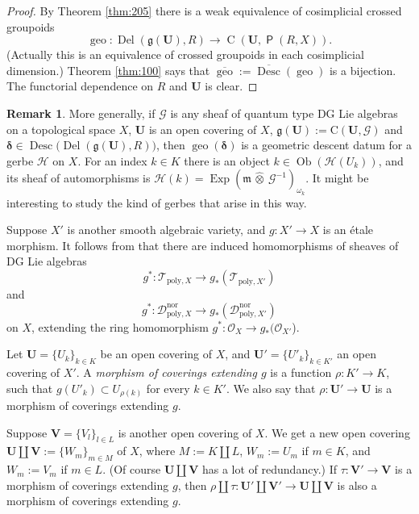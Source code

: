 \documentclass[a4paper, 10pt]{amsart}
\theoremstyle{definition}
\newtheorem{rem}[equation]{Remark}
\numberwithin{equation}{section}
\newcommand{\opn}{\operatorname}
\newcommand{\cat}[1]{\operatorname{\mathsf{#1}}}
\newcommand{\ol}{\overline}
\newcommand{\mfrak}[1]{\mathfrak{#1}}
\newcommand{\mcal}[1]{\mathcal{#1}}
\newcommand{\mrm}[1]{\mathrm{#1}}
\newcommand{\bsym}[1]{\boldsymbol{#1}}
\newcommand{\hatotimes}[1]{\, \what{{\otimes}}_{#1} \,}
\newcommand{\hot}{\hatotimes{}}
\newcommand{\what}[1]{\widehat{#1}}
\newcommand{\g}{\mfrak{g}}
\newcommand{\m}{\mfrak{m}}
\newcommand{\om}{\omega}
\newcommand{\gerbe}[1]{\bsym{\mcal{#1}}}
\newcommand{\twocat}[1]{\operatorname{\bsym{\cat{#1}}}}
\begin{document}
\begin{proof}
By Theorem \ref{thm:205} there is a weak equivalence of cosimplicial crossed 
groupoids  
\[  \opn{geo} :  \opn{Del}(\g(\bsym{U}) , R) \to
\opn{C}(\bsym{U} , \twocat{P}(R, X))  . \]
(Actually this is an equivalence of crossed groupoids in each cosimplicial
dimension.) Theorem \ref{thm:100} says that 
$\ol{\opn{geo}} := \ol{\opn{Desc}}(\opn{geo})$ is a bijection.
The functorial dependence on $R$ and $\bsym{U}$ is clear.
\end{proof}

\begin{rem}
More generally, if $\mcal{G}$ is any sheaf of quantum type DG Lie
algebras on a topological space $X$, 
$\bsym{U}$ is an open covering of $X$,
$\g(\bsym{U}) := \mrm{C}(\bsym{U}, \mcal{G})$
and 
$\bsym{\delta} \in \opn{Desc}\bigl( \opn{Del}(\g(\bsym{U}), R) \bigr)$, 
then $\opn{geo}(\bsym{\delta})$ is a geometric descent datum for a gerbe 
$\gerbe{H}$ on $X$. For an index $k \in K$ 
there is an object
$k \in \opn{Ob} (\gerbe{H}(U_k))$, and its sheaf of automorphisms
is 
$\gerbe{H}(k) = \opn{Exp}(\m \hot \mcal{G}^{-1})_{\om_{k}}$.
It might be interesting to study the kind of gerbes that arise in
this way.
\end{rem}

Suppose $X'$ is another smooth algebraic variety, and $g : X' \to X$ is an
\'etale morphism. 
It follows from \cite[Proposition 4.6]{Ye2} that there are
induced homomorphisms of sheaves of DG Lie algebras 
\begin{equation}
g^* : \mcal{T}^{}_{\mrm{poly}, X} \to
g_* (\mcal{T}^{}_{\mrm{poly}, X'})
\end{equation}
and
\begin{equation}
g^* : \mcal{D}_{\mrm{poly}, X}^{\mrm{nor}} \to 
g_* (\mcal{D}_{\mrm{poly}, X'}^{\mrm{nor}})
\end{equation}
on $X$, extending the ring homomorphism
$g^* : \mcal{O}_X \to g_* (\mcal{O}_{X'}$).

Let $\bsym{U} = \{ U_k \}_{k \in K}$ be an open covering of $X$,
and $\bsym{U}' = \{ U'_k \}_{k \in K'}$ an open covering of
$X'$. A {\em morphism of coverings extending $g$}
is a function $\rho : K' \to K$, such that $g(U'_k) \subset U_{\rho(k)}$ for
every $k \in K'$. We also say that
$\rho : \bsym{U}' \to \bsym{U}$
is a morphism of coverings extending $g$.

Suppose $\bsym{V} = \{ V_l \}_{l \in L}$ is another open
covering of $X$. We get a new open covering 
$\bsym{U} \coprod \bsym{V} := \{ W_m \}_{m \in M}$ of $X$, where
$M := K \coprod L$, $W_m := U_m$ if $m \in K$, and 
$W_m := V_m$ if $m \in L$. (Of course $\bsym{U} \coprod \bsym{V}$ has a
lot of redundancy.) If $\tau : \bsym{V}' \to \bsym{V}$
is a morphism of coverings extending $g$, then 
$\rho \amalg \tau : \bsym{U}' \coprod \bsym{V}' \to \bsym{U} \coprod \bsym{V}$
is also a morphism of coverings extending $g$.
\end{document}
